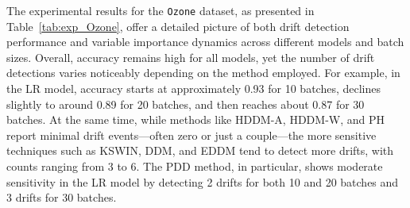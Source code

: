 \documentclass[pdflatex,sn-mathphys-ay]{sn-jnl}%
\theoremstyle{thmstyleone}%
\theoremstyle{thmstyletwo}%
\theoremstyle{thmstylethree}%
\begin{document}
The experimental results for the \texttt{Ozone} dataset, as presented in Table~\ref{tab:exp_Ozone}, offer a detailed picture of both drift detection performance and variable importance dynamics across different models and batch sizes. Overall, accuracy remains high for all models, yet the number of drift detections varies noticeably depending on the method employed. For example, in the LR model, accuracy starts at approximately 0.93 for 10 batches, declines slightly to around 0.89 for 20 batches, and then reaches about 0.87 for 30 batches. At the same time, while methods like HDDM-A, HDDM-W, and PH report minimal drift events—often zero or just a couple—the more sensitive techniques such as KSWIN, DDM, and EDDM tend to detect more drifts, with counts ranging from 3 to 6. The PDD method, in particular, shows moderate sensitivity in the LR model by detecting 2 drifts for both 10 and 20 batches and 3 drifts for 30 batches.
\end{document}
